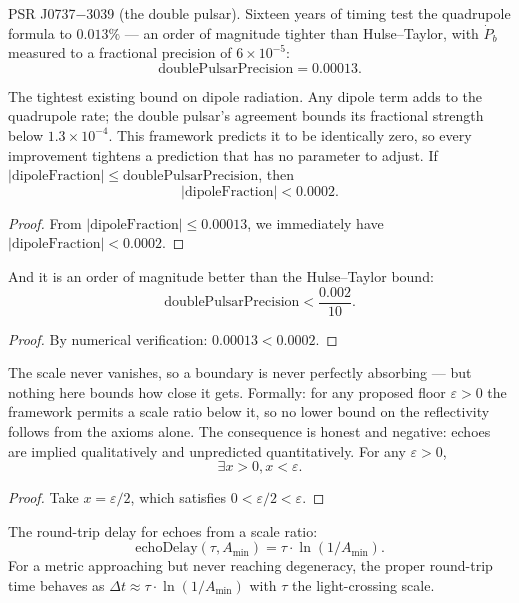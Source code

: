 \begin{definition}
PSR J0737−3039 (the double pulsar). Sixteen years of timing test the quadrupole formula to $0.013\%$ — an order of magnitude tighter than Hulse–Taylor, with $\dot{P}_b$ measured to a fractional precision of $6 \times 10^{-5}$:
\[
\text{doublePulsarPrecision} = 0.00013.
\]
\end{definition}

\begin{theorem}
The tightest existing bound on dipole radiation. Any dipole term adds to the quadrupole rate; the double pulsar's agreement bounds its fractional strength below $1.3 \times 10^{-4}$. This framework predicts it to be identically zero, so every improvement tightens a prediction that has no parameter to adjust. If $|\text{dipoleFraction}| \leq \text{doublePulsarPrecision}$, then
\[
|\text{dipoleFraction}| < 0.0002.
\]
\begin{proof}
From $|\text{dipoleFraction}| \leq 0.00013$, we immediately have $|\text{dipoleFraction}| < 0.0002$.
\end{proof}
\end{theorem}

\begin{theorem}
And it is an order of magnitude better than the Hulse–Taylor bound:
\[
\text{doublePulsarPrecision} < \frac{0.002}{10}.
\]
\begin{proof}
By numerical verification: $0.00013 < 0.0002$.
\end{proof}
\end{theorem}

\begin{theorem}
The scale never vanishes, so a boundary is never perfectly absorbing — but nothing here bounds how close it gets. Formally: for any proposed floor $\varepsilon > 0$ the framework permits a scale ratio below it, so no lower bound on the reflectivity follows from the axioms alone. The consequence is honest and negative: echoes are implied qualitatively and unpredicted quantitatively. For any $\varepsilon > 0$,
\[
\exists x > 0, x < \varepsilon.
\]
\begin{proof}
Take $x = \varepsilon/2$, which satisfies $0 < \varepsilon/2 < \varepsilon$.
\end{proof}
\end{theorem}

\begin{definition}
The round-trip delay for echoes from a scale ratio:
\[
\text{echoDelay}(\tau, A_{\min}) = \tau \cdot \ln(1/A_{\min}).
\]
For a metric approaching but never reaching degeneracy, the proper round-trip time behaves as $\Delta t \approx \tau \cdot \ln(1/A_{\min})$ with $\tau$ the light-crossing scale.
\end{definition}

